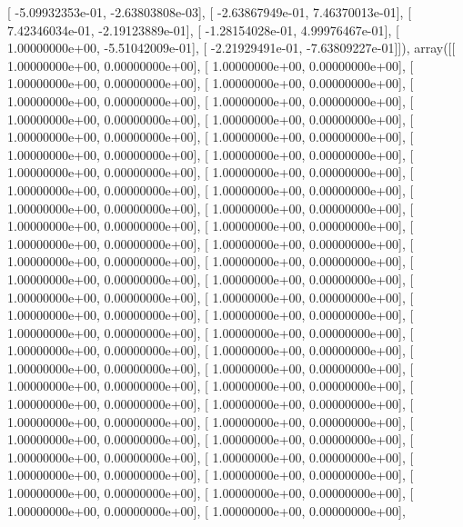 \documentclass{article}
\begin{document}
       [ -5.09932353e-01,  -2.63803808e-03],
       [ -2.63867949e-01,   7.46370013e-01],
       [  7.42346034e-01,  -2.19123889e-01],
       [ -1.28154028e-01,   4.99976467e-01],
       [  1.00000000e+00,  -5.51042009e-01],
       [ -2.21929491e-01,  -7.63809227e-01]]), array([[  1.00000000e+00,   0.00000000e+00],
       [  1.00000000e+00,   0.00000000e+00],
       [  1.00000000e+00,   0.00000000e+00],
       [  1.00000000e+00,   0.00000000e+00],
       [  1.00000000e+00,   0.00000000e+00],
       [  1.00000000e+00,   0.00000000e+00],
       [  1.00000000e+00,   0.00000000e+00],
       [  1.00000000e+00,   0.00000000e+00],
       [  1.00000000e+00,   0.00000000e+00],
       [  1.00000000e+00,   0.00000000e+00],
       [  1.00000000e+00,   0.00000000e+00],
       [  1.00000000e+00,   0.00000000e+00],
       [  1.00000000e+00,   0.00000000e+00],
       [  1.00000000e+00,   0.00000000e+00],
       [  1.00000000e+00,   0.00000000e+00],
       [  1.00000000e+00,   0.00000000e+00],
       [  1.00000000e+00,   0.00000000e+00],
       [  1.00000000e+00,   0.00000000e+00],
       [  1.00000000e+00,   0.00000000e+00],
       [  1.00000000e+00,   0.00000000e+00],
       [  1.00000000e+00,   0.00000000e+00],
       [  1.00000000e+00,   0.00000000e+00],
       [  1.00000000e+00,   0.00000000e+00],
       [  1.00000000e+00,   0.00000000e+00],
       [  1.00000000e+00,   0.00000000e+00],
       [  1.00000000e+00,   0.00000000e+00],
       [  1.00000000e+00,   0.00000000e+00],
       [  1.00000000e+00,   0.00000000e+00],
       [  1.00000000e+00,   0.00000000e+00],
       [  1.00000000e+00,   0.00000000e+00],
       [  1.00000000e+00,   0.00000000e+00],
       [  1.00000000e+00,   0.00000000e+00],
       [  1.00000000e+00,   0.00000000e+00],
       [  1.00000000e+00,   0.00000000e+00],
       [  1.00000000e+00,   0.00000000e+00],
       [  1.00000000e+00,   0.00000000e+00],
       [  1.00000000e+00,   0.00000000e+00],
       [  1.00000000e+00,   0.00000000e+00],
       [  1.00000000e+00,   0.00000000e+00],
       [  1.00000000e+00,   0.00000000e+00],
       [  1.00000000e+00,   0.00000000e+00],
       [  1.00000000e+00,   0.00000000e+00],
       [  1.00000000e+00,   0.00000000e+00],
       [  1.00000000e+00,   0.00000000e+00],
       [  1.00000000e+00,   0.00000000e+00],
       [  1.00000000e+00,   0.00000000e+00],
       [  1.00000000e+00,   0.00000000e+00],
       [  1.00000000e+00,   0.00000000e+00],
       [  1.00000000e+00,   0.00000000e+00],
       [  1.00000000e+00,   0.00000000e+00],
       [  1.00000000e+00,   0.00000000e+00],
       [  1.00000000e+00,   0.00000000e+00],
\end{document}
